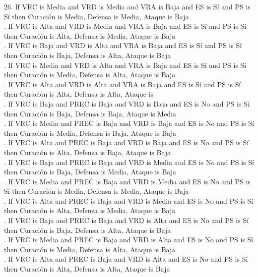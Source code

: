 {26. If VRC is Media and VRD is Media and VRA is Baja and ES is Sí and PS is Sí then Curación is Media, Defensa is Media, Ataque is Baja\\. If VRC is Alta and VRD is Media and VRA is Baja and ES is Sí and PS is Sí then Curación is Alta, Defensa is Media, Ataque is Baja\\. If VRC is Baja and VRD is Alta and VRA is Baja and ES is Sí and PS is Sí then Curación is Baja, Defensa is Alta, Ataque is Baja\\. If VRC is Media and VRD is Alta and VRA is Baja and ES is Sí and PS is Sí then Curación is Media, Defensa is Alta, Ataque is Baja\\. If VRC is Alta and VRD is Alta and VRA is Baja and ES is Sí and PS is Sí then Curación is Alta, Defensa is Alta, Ataque is \\. If VRC is Baja and PREC is Baja and VRD is Baja and ES is No and PS is Sí then Curación is Baja, Defensa is Baja, Ataque is Media\\. If VRC is Media and PREC is Baja and VRD is Baja and ES is No and PS is Sí then Curación is Media, Defensa is Baja, Ataque is Baja\\. If VRC is Alta and PREC is Baja and VRD is Baja and ES is No and PS is Sí then Curación is Alta, Defensa is Baja, Ataque is Baja\\. If VRC is Baja and PREC is Baja and VRD is Media and ES is No and PS is Sí then Curación is Baja, Defensa is Media, Ataque is Baja\\. If VRC is Media and PREC is Baja and VRD is Media and ES is No and PS is Sí then Curación is Media, Defensa is Media, Ataque is Baja\\. If VRC is Alta and PREC is Baja and VRD is Media and ES is No and PS is Sí then Curación is Alta, Defensa is Media, Ataque is Baja\\. If VRC is Baja and PREC is Baja and VRD is Alta and ES is No and PS is Sí then Curación is Baja, Defensa is Alta, Ataque is Baja\\. If VRC is Media and PREC is Baja and VRD is Alta and ES is No and PS is Sí then Curación is Media, Defensa is Alta, Ataque is Baja\\. If VRC is Alta and PREC is Baja and VRD is Alta and ES is No and PS is Sí then Curación is Alta, Defensa is Alta, Ataque is Baja
}

